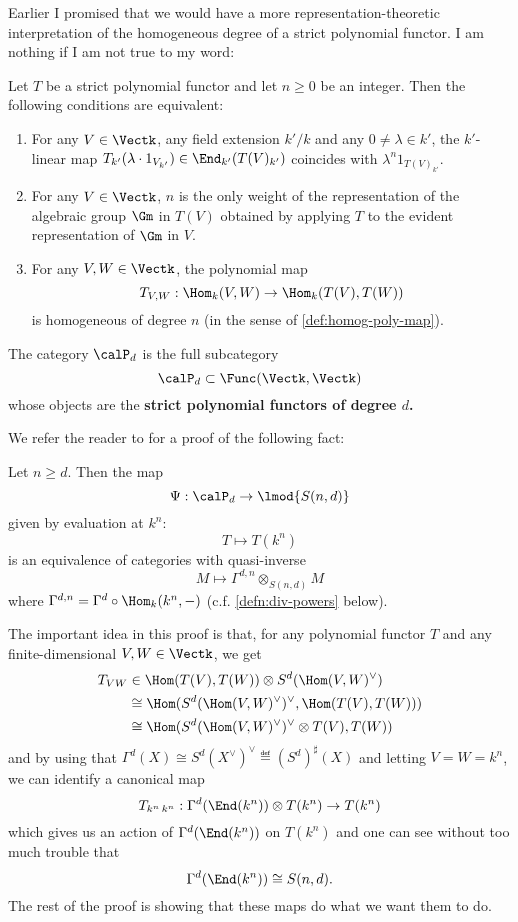 \documentclass[12pt]{article}
\begin{document}
Earlier I promised that we would have a more representation-theoretic interpretation of the homogeneous degree 
of a strict polynomial functor. I am nothing if I am not true to my word:
\begin{lem}
	Let $T$ be a strict polynomial functor and let $n\ge 0$ be an integer. Then the following conditions are equivalent:
	\begin{enumerate}
		\item For any $V\in\Vectk$, any field extension $k'/k$ and any $0\ne\lambda\in k'$, the $k'$-linear 
		map $T_{k'}(\lambda\cdot 1_{V_{k'}})\in\End_{k'}(T(V)_{k'})$ coincides with $\lambda^n1_{T(V)_{k'}}$.
		\item For any $V\in\Vectk$, $n$ is the only weight of the representation of the algebraic group $\Gm$ in $T(V)$
		obtained by applying $T$ to the evident representation of $\Gm$ in $V$.
		\item For any $V,W\in\Vectk$, the polynomial map 
		\[T_{V,W}:\Hom_k(V,W)\to \Hom_k(T(V),T(W))\] 
		is homogeneous of degree $n$ (in the sense of \ref{def:homog-poly-map}).
	\end{enumerate}
\end{lem}

\begin{defn}
	The category $\calP_d$ is the full subcategory 
	\[\calP_d\subset\Func(\Vectk,\Vectk)\]
	whose objects are the \textbf{strict polynomial functors of degree $d$.}
\end{defn}

We refer the reader to \cite[Thm. 3.2]{friedlander-suslin} for a proof of the following fact:
\begin{thm}\label{thm:FS-equiv}
	Let $n\ge d$. Then the map
	\[\Psi:\calP_d\to \lmod {S(n,d)}\]
	given by evaluation at $k^n$:
	\[T\mapsto T(k^n)\]
	is an equivalence of categories with quasi-inverse 
	\[M\mapsto\Gamma^{d,n}\otimes_{S(n,d)}M\]
	where $\Gamma^{d,n}=\Gamma^d\circ\Hom_k(k^n,-)$ (c.f. \ref{defn:div-powers} below).
\end{thm}

The important idea in this proof is that, for any polynomial functor $T$ and any finite-dimensional $V,W\in\Vectk$,
we get 
\begin{align*}T_{VW}&\in\Hom(T(V),T(W))\otimes S^d(\Hom(V,W)^\vee)\\
	&\cong\Hom(S^d(\Hom(V,W)^\vee)^\vee,\Hom(T(V),T(W)))\\
	&\cong\Hom(S^d(\Hom(V,W)^\vee)^\vee\otimes T(V),T(W))
\end{align*}
and by using that $\Gamma^d(X)\cong S^d(X^\vee)^\vee\eqdef (S^d)^\sharp(X)$ and letting $V=W=k^n$, we can identify a canonical map 
\[T_{k^n\,k^n}:\Gamma^d(\End(k^n))\otimes T(k^n)\to T(k^n)\]
which gives us an action of $\Gamma^d(\End(k^n))$ on $T(k^n)$ and one can see without too much trouble that 
\[\Gamma^d(\End(k^n))\cong S(n,d).\]
The rest of the proof is showing that these maps do what we want them to do.
\end{document}
